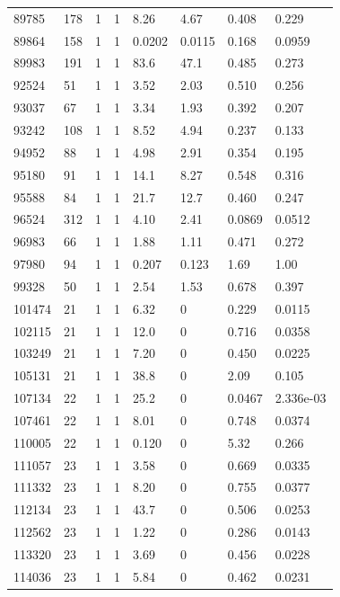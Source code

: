 \documentclass[preview]{standalone}
\begin{document}
{{{{{{{{{{{{{{{\begin{tabular}{L{1.2cm}C{1.2cm} C{0.3cm}C{0.5cm} C{1.4cm}C{1.4cm} C{1.4cm}C{1.4cm}}
  89785  &   178  & 1     &  1 &  8.26  & 4.67  & 0.408 &  0.229   \\ 
  89864  &   158  & 1     &  1 &  0.0202  & 0.0115  & 0.168 &  0.0959   \\ 
  89983  &   191  & 1     &  1 &  83.6  & 47.1  & 0.485 &  0.273   \\ 
  92524  &    51  & 1     &  1 &  3.52  & 2.03  & 0.510 &  0.256   \\ 
  93037  &    67  & 1     &  1 &  3.34  & 1.93  & 0.392 &  0.207   \\ 
  93242  &   108  & 1     &  1 &  8.52  & 4.94  & 0.237 &  0.133   \\ 
  94952  &    88  & 1     &  1 &  4.98  & 2.91  & 0.354 &  0.195   \\ 
  95180  &    91  & 1     &  1 &  14.1  & 8.27  & 0.548 &  0.316   \\ 
  95588  &    84  & 1     &  1 &  21.7  & 12.7  & 0.460 &  0.247   \\ 
  96524  &   312  & 1     &  1 &  4.10  & 2.41  & 0.0869 &  0.0512   \\ 
  96983  &    66  & 1     &  1 &  1.88  & 1.11  & 0.471 &  0.272   \\ 
  97980  &    94  & 1     &  1 &  0.207  & 0.123  & 1.69 &  1.00   \\ 
  99328  &    50  & 1     &  1 &  2.54  & 1.53  & 0.678 &  0.397   \\ 
  101474  &    21  & 1     &  1 &  6.32  & 0  & 0.229 &  0.0115   \\ 
  102115  &    21  & 1     &  1 &  12.0  & 0  & 0.716 &  0.0358   \\ 
  103249  &    21  & 1     &  1 &  7.20  & 0  & 0.450 &  0.0225   \\ 
  105131  &    21  & 1     &  1 &  38.8  & 0  & 2.09 &  0.105   \\ 
  107134  &    22  & 1     &  1 &  25.2  & 0  & 0.0467 &  2.336e-03   \\ 
  107461  &    22  & 1     &  1 &  8.01  & 0  & 0.748 &  0.0374   \\ 
  110005  &    22  & 1     &  1 &  0.120  & 0  & 5.32 &  0.266   \\ 
  111057  &    23  & 1     &  1 &  3.58  & 0  & 0.669 &  0.0335   \\ 
  111332  &    23  & 1     &  1 &  8.20  & 0  & 0.755 &  0.0377   \\ 
  112134  &    23  & 1     &  1 &  43.7  & 0  & 0.506 &  0.0253   \\ 
  112562  &    23  & 1     &  1 &  1.22  & 0  & 0.286 &  0.0143   \\ 
  113320  &    23  & 1     &  1 &  3.69  & 0  & 0.456 &  0.0228   \\ 
  114036  &    23  & 1     &  1 &  5.84  & 0  & 0.462 &  0.0231   \\ 
\hline 
\end{tabular} 

}}}}}}}}}}}}}}}
\end{document}

